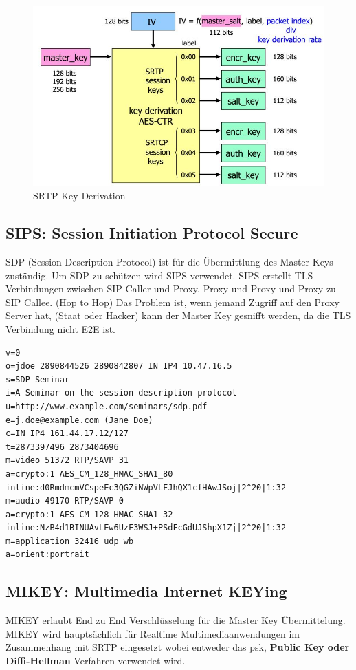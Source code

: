 \begin{figure}[h]
\centering
\includegraphics[width=0.5\linewidth]{images/srtp_key_derivation}
\caption{SRTP Key Derivation}
\label{fig:srtpkeyderivation}
\end{figure}

\subsection{SIPS: Session Initiation Protocol Secure}
SDP (Session Description Protocol) ist für die Übermittlung des Master Keys zuständig. Um SDP zu schützen wird SIPS verwendet. SIPS erstellt TLS Verbindungen zwischen SIP Caller und Proxy, Proxy und Proxy und Proxy zu SIP Callee. (Hop to Hop) Das Problem ist, wenn jemand Zugriff auf den Proxy Server hat, (Staat oder Hacker) kann der Master Key gesnifft werden, da die TLS Verbindung nicht E2E ist.

\begin{lstlisting}[caption=Unverschlüsselte SDP Master Key Übertragung (crypto)]
v=0
o=jdoe 2890844526 2890842807 IN IP4 10.47.16.5
s=SDP Seminar
i=A Seminar on the session description protocol
u=http://www.example.com/seminars/sdp.pdf
e=j.doe@example.com (Jane Doe)
c=IN IP4 161.44.17.12/127
t=2873397496 2873404696
m=video 51372 RTP/SAVP 31
a=crypto:1 AES_CM_128_HMAC_SHA1_80
inline:d0RmdmcmVCspeEc3QGZiNWpVLFJhQX1cfHAwJSoj|2^20|1:32
m=audio 49170 RTP/SAVP 0
a=crypto:1 AES_CM_128_HMAC_SHA1_32
inline:NzB4d1BINUAvLEw6UzF3WSJ+PSdFcGdUJShpX1Zj|2^20|1:32
m=application 32416 udp wb
a=orient:portrait
\end{lstlisting}

\subsection{MIKEY: Multimedia Internet KEYing}
MIKEY erlaubt End zu End Verschlüsselung für die Master Key Übermittelung. MIKEY wird hauptsächlich für Realtime Multimediaanwendungen im Zusammenhang mit SRTP eingesetzt wobei entweder das \gls{psk}, \textbf{Public Key oder Diffi-Hellman} Verfahren verwendet wird.


